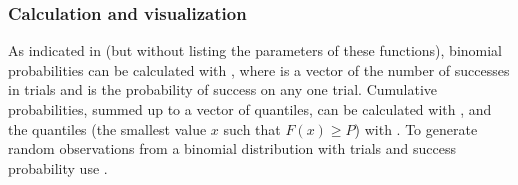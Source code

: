 \documentclass[11pt]{book}
\begin{document}
\subsubsection{Calculation and visualization}
As indicated in  (but without listing the
parameters of these functions), 
binomial probabilities
can be calculated with , 
where  is a vector of the number of successes in 
trials and  is the probability of success on any one trial.
Cumulative probabilities, summed up to a vector of quantiles, 
can be calculated with ,
and the quantiles (the smallest value $x$ such that $F(x) \ge P$)
with .
To generate  random observations from a binomial distribution
with  trials and success probability 
use .
\end{document}
